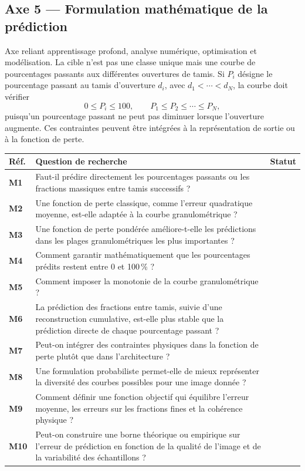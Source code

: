 \documentclass[11pt,a4paper]{article}
\makeatletter
\newenvironment{qtable}{%
  \par\smallskip
  \begin{longtable}{@{}>{\bfseries}p{1.0cm} p{12.3cm} p{1.5cm}@{}}
  \toprule
  \textbf{Réf.} & \textbf{Question de recherche} & \textbf{Statut}\\
  \midrule
  \endhead
}{%
  \bottomrule
  \end{longtable}
}
\makeatother
\begin{document}
\subsection*{Axe 5 --- Formulation mathématique de la prédiction}
Axe reliant apprentissage profond, analyse numérique, optimisation et modélisation. La cible n'est pas une classe unique mais une courbe de pourcentages passants aux différentes ouvertures de tamis. Si $P_i$ désigne le pourcentage passant au tamis d'ouverture $d_i$, avec $d_1<\cdots<d_N$, la courbe doit vérifier
\[
0\le P_i\le 100,\qquad P_1\le P_2\le\cdots\le P_N,
\]
puisqu'un pourcentage passant ne peut pas diminuer lorsque l'ouverture augmente. Ces contraintes peuvent être intégrées à la représentation de sortie ou à la fonction de perte.
\begin{qtable}
M1 & Faut-il prédire directement les pourcentages passants ou les fractions massiques entre tamis successifs ? & \\
M2 & Une fonction de perte classique, comme l'erreur quadratique moyenne, est-elle adaptée à la courbe granulométrique ? & \\
M3 & Une fonction de perte pondérée améliore-t-elle les prédictions dans les plages granulométriques les plus importantes ? & \\
M4 & Comment garantir mathématiquement que les pourcentages prédits restent entre 0 et 100\,\% ? & \\
M5 & Comment imposer la monotonie de la courbe granulométrique ? & \\
M6 & La prédiction des fractions entre tamis, suivie d'une reconstruction cumulative, est-elle plus stable que la prédiction directe de chaque pourcentage passant ? & \\
M7 & Peut-on intégrer des contraintes physiques dans la fonction de perte plutôt que dans l'architecture ? & \\
M8 & Une formulation probabiliste permet-elle de mieux représenter la diversité des courbes possibles pour une image donnée ? & \\
M9 & Comment définir une fonction objectif qui équilibre l'erreur moyenne, les erreurs sur les fractions fines et la cohérence physique ? & \\
M10 & Peut-on construire une borne théorique ou empirique sur l'erreur de prédiction en fonction de la qualité de l'image et de la variabilité des échantillons ? & \\
\end{qtable}
\end{document}
